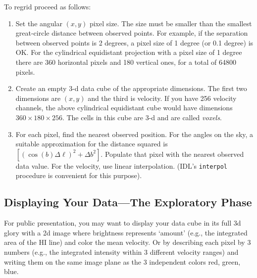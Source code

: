 \documentclass[psfig,preprint]{aastex}
\begin{document}
To regrid proceed as
follows: \begin{enumerate}

\item Set the angular $(x,y)$ pixel size. The size must be smaller than
  the smallest great-circle distance between observed points. For
  example, if the separation between observed points is 2 degrees, a
  pixel size of 1 degree (or 0.1 degree) is OK. For the cylindrical
  equidistant projection with a pixel size of 1 degree there are 360
  horizontal pixels and 180 vertical ones, for a total of 64800 pixels.

\item Create an empty 3-d data cube of the appropriate dimensions. The
  first two dimensions are $(x,y)$ and the third is velocity. If you
  have 256 velocity channels, the above cylindrical equidistant cube
  would have dimensions $360 \times 180 \times 256$. The cells in this
  cube are 3-d and are called {\it voxels}.

\item For each pixel, find the nearest observed position. For the angles
  on the sky, a suitable approximation for the distance squared is $[
    (\cos (b) \Delta \ell)^2 + \Delta b^2]$. Populate that pixel with
  the nearest observed data value. For the velocity, use linear
  interpolation.  (IDL's {\tt interpol} procedure is convenient for
  this purpose).

\end{enumerate}

\subsection{Displaying Your Data---The Exploratory Phase}

For public presentation, you may want to display your data cube in its
full 3d glory with a 2d image where brightness represents `amount'
(e.g., the integrated area of the HI line) and color the mean
velocity. Or by describing each pixel by 3 numbers (e.g., the integrated
intensity within 3 different velocity ranges) and writing them on the
same image plane as the 3 independent colors red, green, blue.
\end{document}
